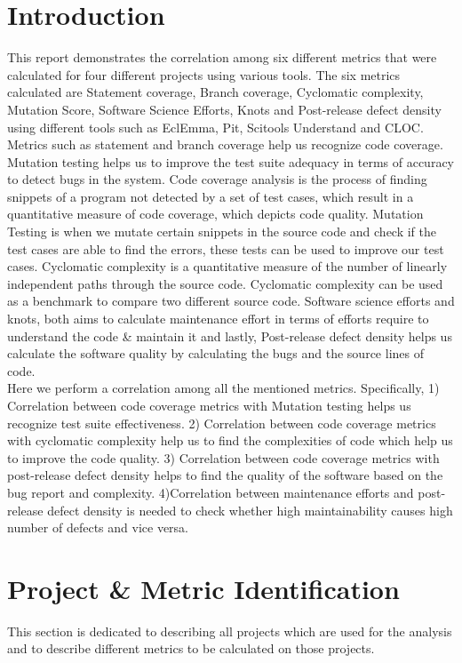 \documentclass[letterpaper, 12 pt, conference]{ieeetran}  %
\begin{document}
\section{Introduction}
This report demonstrates the correlation among six different metrics that were calculated for four different projects using various tools. The six metrics calculated are Statement coverage, Branch coverage, Cyclomatic complexity, Mutation Score, Software Science Efforts, Knots and Post-release defect density using different tools such as EclEmma, Pit, Scitools Understand and CLOC. Metrics such as statement and branch coverage help us recognize code coverage. Mutation testing helps us to improve the test suite adequacy in terms of accuracy to detect bugs in the system. Code coverage analysis is the process of finding snippets of a program not detected by a set of test cases, which result in a quantitative measure of code coverage, which depicts code quality. Mutation Testing is when we mutate certain snippets in the source code and check if the test cases are able to find the errors, these tests can be used to improve our test cases. Cyclomatic complexity is a quantitative measure of the number of linearly independent paths through the source code. Cyclomatic complexity can be used as a benchmark to compare two different source code. Software science efforts and knots, both aims to calculate maintenance effort in terms of efforts require to understand the code \& maintain it and lastly, Post-release defect density helps us calculate the software quality by calculating the bugs and the source lines of code.\\
Here we perform a correlation among all the mentioned metrics. Specifically, 1) Correlation between code coverage metrics with Mutation testing helps us recognize test suite effectiveness. 2) Correlation between code coverage metrics with cyclomatic complexity help us to find the complexities of code which help us to improve the code quality. 3) Correlation between code coverage metrics with post-release defect density helps to find the quality of the software based on the bug report and complexity. 4)Correlation between maintenance efforts and post-release defect density is needed to check whether high maintainability causes high number of defects and vice versa.

\section{Project \& Metric Identification}
This section is dedicated to describing all projects which are used for the analysis and to describe different metrics to be calculated on those projects.
\end{document}
